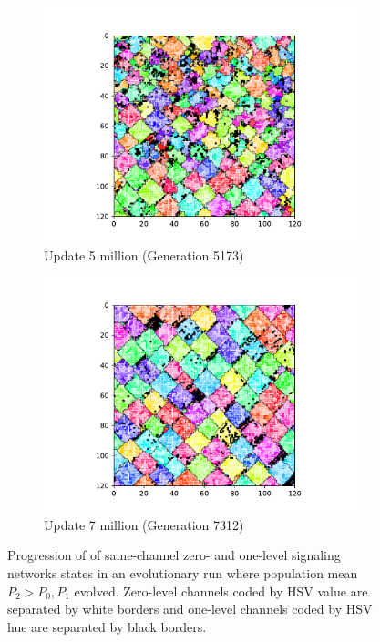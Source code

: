 \begin{figure}[t]
\begin{center}
\begin{subfigure}[b]{0.5\columnwidth}
  \includegraphics[width=\columnwidth,trim={2.5cm 0.5cm 2.5cm 1cm},clip]{img/ChannelMap_1011_update5000000}
  \caption{Update 5 million (Generation 5173)}
  \label{fig:ChannelMap_1011_update5000000}
\end{subfigure}%
\begin{subfigure}[b]{0.5\columnwidth}
  \includegraphics[width=\columnwidth,trim={2.5cm 0.5cm 2.5cm 1cm},clip]{img/ChannelMap_1011_update7000000}
  \caption{Update 7 million (Generation 7312)}
  \label{fig:ChannelMap_1011_update7000000}
\end{subfigure}
\caption{
Progression of of same-channel zero- and one-level signaling networks states in an evolutionary run where population mean $P_2 > P_0, P_1$ evolved.
Zero-level channels coded by HSV value are separated by white borders and one-level channels coded by HSV hue are separated by black borders.
}
\label{fig:grid_progression}
\end{center}
\end{figure}
